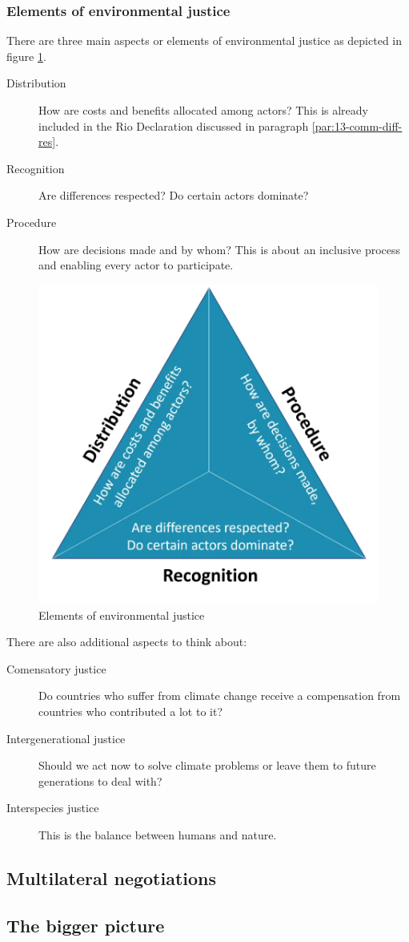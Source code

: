 \documentclass[../summary.tex]{subfiles}
\begin{document}
		\subsubsection{Elements of environmental justice}
			There are three main aspects or elements of environmental justice as depicted in figure \ref{fig:13-elements-of-justice}.
			\begin{description}
				\item[Distribution] How are costs and benefits allocated among actors? This is already included in the Rio Declaration discussed in paragraph \ref{par:13-comm-diff-res}.
				\item[Recognition] Are differences respected? Do certain actors dominate?
				\item[Procedure] How are decisions made and by whom? This is about an inclusive process and enabling every actor to participate.
			\end{description}
			\begin{figure}[h]
				\centering
				\includegraphics[width=0.5\linewidth]{../images/13-elements-of-justice.png}
				\caption{Elements of environmental justice}
				\label{fig:13-elements-of-justice}
			\end{figure}
			There are also additional  aspects to think about:
			\begin{description}
				\item[Comensatory justice] Do countries who suffer from climate change receive a compensation from countries who contributed a lot to it?
				\item[Intergenerational justice] Should we act now to solve climate problems or leave them to future generations to deal with?
				\item[Interspecies justice] This is the balance between humans and nature. 
			\end{description}
	\subsection{Multilateral negotiations}
	
	\subsection{The bigger picture}
\end{document}
